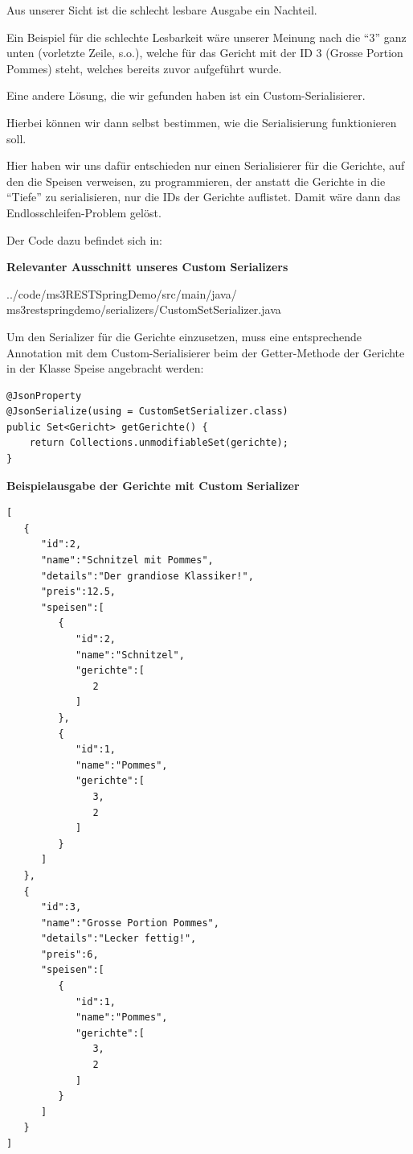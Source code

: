 Aus unserer Sicht ist die schlecht lesbare Ausgabe ein
Nachteil.

Ein Beispiel f\"ur die schlechte Lesbarkeit w\"are unserer
Meinung nach die "`3"' ganz unten (vorletzte Zeile, s.o.),
welche f\"ur das Gericht mit der ID 3 (Grosse Portion
Pommes) steht, welches bereits zuvor aufgef\"uhrt wurde.

Eine andere L\"osung, die wir gefunden haben ist ein
Custom-Serialisierer.

Hierbei k\"onnen wir dann selbst bestimmen, wie die
Serialisierung funktionieren soll.

Hier haben wir uns dafür entschieden nur einen
Serialisierer für die Gerichte, auf den die Speisen
verweisen, zu programmieren, der anstatt die Gerichte in
die "`Tiefe"' zu serialisieren, nur die IDs der Gerichte
auflistet. Damit w\"are dann das Endlosschleifen-Problem
gel\"ost.

Der Code dazu befindet sich in:
\begin{mdframed}[style=codebox]
\textbf{Relevanter Ausschnitt unseres Custom Serializers}

{%
  ../code/ms3RESTSpringDemo/src/main/java/%
  ms3restspringdemo/serializers/CustomSetSerializer.java
}
\end{mdframed}

Um den Serializer für die Gerichte einzusetzen, muss eine
entsprechende Annotation mit dem Custom-Serialisierer beim
der Getter-Methode der Gerichte in der Klasse Speise
angebracht werden:

\begin{mdframed}[style=codebox]
\begin{lstlisting}
@JsonProperty
@JsonSerialize(using = CustomSetSerializer.class)
public Set<Gericht> getGerichte() {
	return Collections.unmodifiableSet(gerichte);
}
\end{lstlisting}
\end{mdframed}

\begin{mdframed}[style=codebox]
\textbf{Beispielausgabe der Gerichte mit Custom Serializer}
\begin{lstlisting}
[
   {
      "id":2,
      "name":"Schnitzel mit Pommes",
      "details":"Der grandiose Klassiker!",
      "preis":12.5,
      "speisen":[
         {
            "id":2,
            "name":"Schnitzel",
            "gerichte":[
               2
            ]
         },
         {
            "id":1,
            "name":"Pommes",
            "gerichte":[
               3,
               2
            ]
         }
      ]
   },
   {
      "id":3,
      "name":"Grosse Portion Pommes",
      "details":"Lecker fettig!",
      "preis":6,
      "speisen":[
         {
            "id":1,
            "name":"Pommes",
            "gerichte":[
               3,
               2
            ]
         }
      ]
   }
]
\end{lstlisting}
\end{mdframed}

